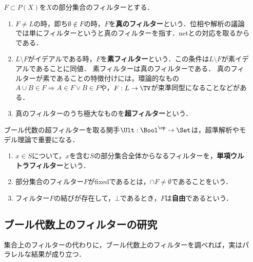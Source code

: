 \documentclass[uplatex,dvipdfmx]{jsreport}
\begin{document}
\begin{definition}
    $F\subset P(X)$を$X$の部分集合のフィルターとする．
    \begin{enumerate}
        \item $F\ne L$の時，即ち$\emptyset\notin F$の時，$F$を\textbf{真のフィルター}という．位相や解析の議論では単にフィルターというと真のフィルターを指す．netとの対応を取るからである．
        \item $L\setminus F$がイデアルである時，$F$を\textbf{素フィルター}という．この条件は$L\setminus F$が素イデアルであることに同値．
        素フィルターは真のフィルターである．
        真のフィルターが素であることの特徴付けには，環論的なもの$A\cup B\in F\Rightarrow A\in F\lor B\in F$や，$F:L\to\TV$が束準同型になることなどがある．
        \item 真のフィルターのうち極大なものを\textbf{超フィルター}という．
    \end{enumerate}
\end{definition}
\begin{remark}
    ブール代数の超フィルターを取る関手$\Ult:\Bool^\op\to\Set$は，超準解析やモデル理論で重要になる．
\end{remark}

\begin{definition}\mbox{}
    \begin{enumerate}
        \item $x\in S$について，$x$を含む$S$の部分集合全体からなるフィルターを，\textbf{単項ウルトラフィルター}という．
        \item 部分集合のフィルター$F$がfixedであるとは，$\cap F\ne\emptyset$であることをいう．
        \item フィルター$F$の結びが存在して，$\bot$であるとき，$F$は\textbf{自由}であるという．
    \end{enumerate}
\end{definition}

\subsection{ブール代数上のフィルターの研究}

\begin{screen}
    集合上のフィルターの代わりに，ブール代数上のフィルターを調べれば，実はパラレルな結果が成り立つ．
\end{screen}
\end{document}
